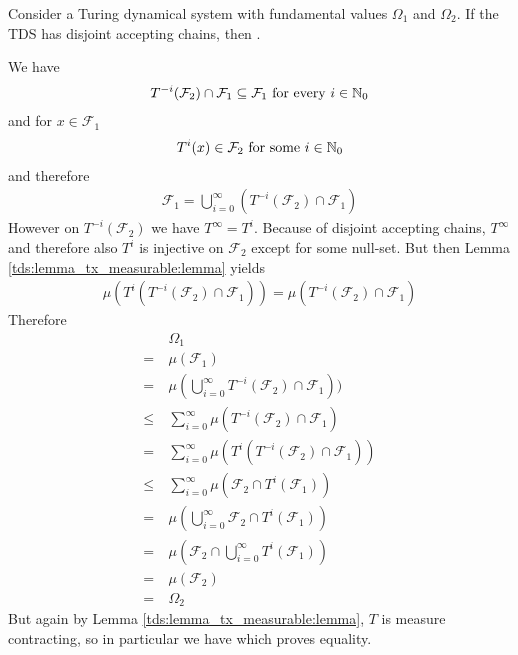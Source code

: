 \begin{Lemma}
	\label{tds:lemma_disj_acc_ch:lemma}
	Consider a Turing dynamical system with fundamental values $\Omega_1$ and $\Omega_2$.
	If the TDS has disjoint accepting chains, then .
\end{Lemma}

\proof
	We have 
	\begin{align*}
		T^{-i}(\mathcal{F}_2) \cap \mathcal{F}_1 \subseteq \mathcal{F}_1 ~\text{for every}~ i \in \mathbb{N}_0
	\end{align*}
	and for $x \in \mathcal{F}_1$
	\begin{align*}
		T^i(x) \in \mathcal{F}_2 ~\text{for some}~ i \in \mathbb{N}_0
	\end{align*}
	and therefore
	\begin{align*}
		\mathcal{F}_1 = \bigcup_{i = 0}^\infty (T^{-i}(\mathcal{F}_2) \cap \mathcal{F}_1)
	\end{align*}
	However on $T^{-i}(\mathcal{F}_2)$ we have $T^\infty = T^i$. Because of disjoint accepting chains, $T^\infty$ and therefore also $T^i$ is injective on $\mathcal{F}_2$ except for some null-set.
	But then Lemma \ref{tds:lemma_tx_measurable:lemma} yields
	\begin{align*}
		\mu(T^i(T^{-i}(\mathcal{F}_2) \cap \mathcal{F}_1)) = \mu(T^{-i}(\mathcal{F}_2) \cap \mathcal{F}_1)
	\end{align*}
	Therefore
	\begin{align*}
		  &\Omega_1 \\
		=~&\mu(\mathcal{F}_1) \\
		=~&\mu(\bigcup_{i=0}^\infty T^{-i}(\mathcal{F}_2) \cap \mathcal{F}_1)) \\
		\leq~&\sum_{i=0}^\infty \mu(T^{-i}(\mathcal{F}_2) \cap \mathcal{F}_1) \\
		=~&\sum_{i=0}^\infty \mu(T^i(T^{-i}(\mathcal{F}_2) \cap \mathcal{F}_1)) \\
		\leq~&\sum_{i=0}^\infty \mu(\mathcal{F}_2 \cap T^i(\mathcal{F}_1)) \\
		=~&\mu(\bigcup_{i=0}^\infty \mathcal{F}_2 \cap T^i(\mathcal{F}_1)) \\
		=~&\mu(\mathcal{F}_2 \cap \bigcup_{i=0}^\infty T^i(\mathcal{F}_1)) \\
		=~&\mu(\mathcal{F}_2) \\
		=~&\Omega_2
	\end{align*}
	But again by Lemma \ref{tds:lemma_tx_measurable:lemma}, $T$ is measure contracting, so in particular we have  which proves equality.
\endproof